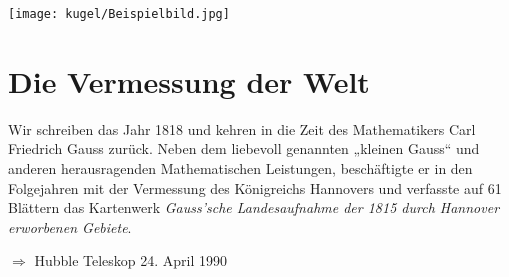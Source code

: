 \begin{refsection}
\begin{center}
        \texttt{[image: kugel/Beispielbild.jpg]}
\end{center}





\section{Die Vermessung der Welt}
Wir schreiben das Jahr 1818 und kehren in die Zeit des Mathematikers Carl Friedrich Gauss zurück. Neben dem liebevoll genannten „kleinen Gauss“ und anderen herausragenden Mathematischen Leistungen, beschäftigte er in den Folgejahren mit der Vermessung des Königreichs Hannovers und verfasste auf 61 Blättern das Kartenwerk \textit{Gauss’sche Landesaufnahme der 1815 durch Hannover erworbenen Gebiete}.
\cite{skript:tabea}


$\Rightarrow$
Hubble Teleskop 
24. April 1990




\printbibliography[heading=subbibliography]
\end{refsection}



